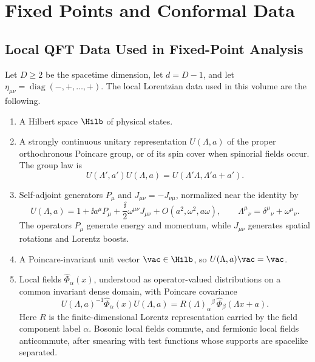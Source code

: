 \chapter{Fixed Points and Conformal Data}
\label{ch:volume-iii-fixed-points-conformal-data}
\ConventionsMixedCFT


\section{Local QFT Data Used in Fixed-Point Analysis}

Let \(D\geq2\) be the spacetime dimension, let \(d=D-1\), and let
\(\eta_{\mu\nu}=\operatorname{diag}(-,+,\ldots,+)\).  The local Lorentzian
data used in this volume are the following.
\begin{enumerate}
  \item A Hilbert space \(\Hilb\) of physical states.
  \item A strongly continuous unitary representation \(U(\Lambda,a)\) of the
  proper orthochronous Poincare group, or of its spin cover when spinorial
  fields occur.  The group law is
  \[
    U(\Lambda',a')U(\Lambda,a)
    =
    U(\Lambda'\Lambda,\Lambda'a+a') .
  \]
  \item Self-adjoint generators \(P_\mu\) and \(J_{\mu\nu}=-J_{\nu\mu}\),
  normalized near the identity by
  \[
    U(\Lambda,a)
    =
    1+\ii a^\mu P_\mu
    +\frac{\ii}{2}\omega^{\mu\nu}J_{\mu\nu}
    +O(a^2,\omega^2,a\omega),
    \qquad
    \Lambda^\mu{}_\nu=\delta^\mu{}_\nu+\omega^\mu{}_\nu .
  \]
  The operators \(P_\mu\) generate energy and momentum, while \(J_{\mu\nu}\)
  generates spatial rotations and Lorentz boosts.
  \item A Poincare-invariant unit vector \(\vac\in\Hilb\), so
  \(U(\Lambda,a)\vac=\vac\).
  \item Local fields \(\widehat\Phi_\alpha(x)\), understood as
  operator-valued distributions on a common invariant dense domain, with
  Poincare covariance
  \[
    U(\Lambda,a)^{-1}\widehat\Phi_\alpha(x)U(\Lambda,a)
    =
    R(\Lambda)_\alpha{}^\beta\,
    \widehat\Phi_\beta(\Lambda x+a).
  \]
  Here \(R\) is the finite-dimensional Lorentz representation carried by the
  field component label \(\alpha\).  Bosonic local fields commute, and
  fermionic local fields anticommute, after smearing with test functions whose
  supports are spacelike separated.
\end{enumerate}

